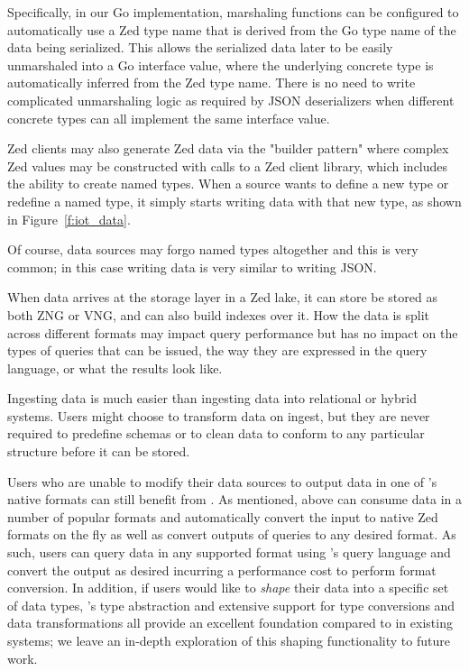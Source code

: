 Specifically, in our Go implementation, marshaling functions can be configured to automatically use a Zed type name that is derived from the Go type name of the data being serialized.  This allows the serialized data later to be easily unmarshaled into a Go interface value, where the underlying concrete type is automatically inferred from the Zed type name.  There is no need to write complicated unmarshaling logic as required by JSON deserializers when different concrete types can all implement the same interface value.

Zed clients may also generate Zed data via the "builder pattern" where complex Zed values may be constructed with calls to a Zed client library, which includes the ability to create named types. When a source wants to define a new type or redefine a named type, it simply starts writing data with that new type, as shown in Figure~\ref{f:iot_data}.

Of course, data sources may forgo named types altogether and this is very common; in this case writing \sys{} data is very similar to writing JSON.

When \sys{} data arrives at the storage layer in a Zed lake, it can store be stored as both ZNG or VNG, and can also build indexes over it. How the data is split across different formats may impact query performance but has no impact on the types of queries that can be issued, the way they are expressed in the query language, or what the results look like. 

Ingesting \sys{} data is much easier than ingesting data into relational or hybrid systems. Users might choose to transform data on ingest, but they are never required to predefine schemas or to clean data to conform to any particular structure before it can be stored.

Users who are unable to modify their data sources to output data in one of \sys{}'s native formats can still benefit from \sys{}.  As mentioned, above \sys{} can consume data in a number of popular formats and automatically convert the input to native Zed formats on the fly as well as convert outputs of queries to any desired format.  As such, users can query data in any supported format using \sys{}'s query language and convert the output as desired incurring a performance cost to perform format conversion. In addition, if users would like to {\em shape} their data into a specific set of data types, \sys{}'s type abstraction and extensive support for type conversions and data transformations all provide an excellent foundation compared to in existing systems; we leave an in-depth exploration of this shaping functionality to future work.

